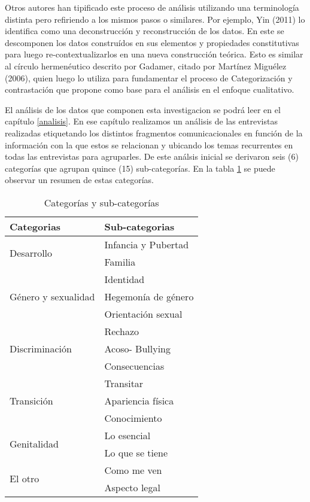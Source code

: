 Otros autores han tipificado este proceso de análisis utilizando una
terminología distinta pero refiriendo a los mismos pasos o similares.
Por ejemplo, Yin (2011) lo identifica como una deconstrucción y
reconstrucción de los datos.
En este se descomponen los datos construídos en sus elementos y propiedades
constitutivas para luego re-contextualizarlos en una nueva construcción teórica.
Esto es similar al círculo hermenéutico descrito por Gadamer, citado por
Martínez Miguélez (2006), quien luego lo utiliza para fundamentar el proceso
de Categorización y contrastación que propone como base para el análisis en
el enfoque cualitativo.

El análisis de los datos que componen esta investigacion se podrá leer en el
capítulo \ref{analisis}.
En ese capítulo realizamos un análisis de las entrevistas realizadas
etiquetando los distintos fragmentos comunicacionales en función de la
información con la que estos se relacionan y ubicando los temas recurrentes
en todas las entrevistas para agruparles.
De este análsis inicial se derivaron seis (6) categorías que agrupan quince
(15) sub-categorías.
En la tabla \ref{tab:categorias} se puede observar un resumen de estas
categorías.

\begin{table}[h]
\centering
\caption{Categorías y sub-categorías}
\label{tab:categorias}
\begin{tabularx}{\textwidth}{@{}XX@{}}
\toprule
Categorias                           & Sub-categorias      \\ \midrule
\multirow{2}{*}{Desarrollo}          & Infancia y Pubertad \\
                                     & Familia             \\ \midrule
\multirow{3}{*}{Género y sexualidad} & Identidad           \\
                                     & Hegemonía de género \\
                                     & Orientación sexual  \\ \midrule
\multirow{3}{*}{Discriminación}      & Rechazo             \\
                                     & Acoso- Bullying     \\
                                     & Consecuencias       \\ \midrule
\multirow{3}{*}{Transición}          & Transitar           \\
                                     & Apariencia física   \\
                                     & Conocimiento        \\ \midrule
\multirow{2}{*}{Genitalidad}         & Lo esencial         \\
                                     & Lo que se tiene     \\ \midrule
\multirow{2}{*}{El otro}             & Como me ven         \\
                                     & Aspecto legal       \\ \bottomrule
\end{tabularx}
\end{table}

